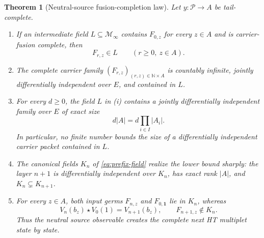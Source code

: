 \documentclass[11pt]{article}
\newtheorem{theorem}{Theorem}[section]
\theoremstyle{definition}
\theoremstyle{remark}
\newcommand{\N}{\mathbb N}
\newcommand{\cM}{\mathcal M}
\newcommand{\cP}{\mathcal P}
\begin{document}
\begin{theorem}[Neutral-source fusion-completion law]\label{thm:master}
Let \(y:\cP\to A\) be tail-complete.

\begin{enumerate}[label=\textup{(\roman*)},leftmargin=2.5em]
  \item If an intermediate field \(L\subseteq\cM_\infty\) contains
  \(F_{0,z}\) for every \(z\in A\) and is carrier-fusion complete, then
  \[
   F_{r,z}\in L\qquad(r\geq0,\ z\in A).
  \]

  \item The complete carrier family \((F_{r,z})_{(r,z)\in\N\times A}\) is countably infinite,
  jointly differentially independent over \(E\), and contained in \(L\).

  \item For every \(d\geq0\), the field \(L\) in \textup{(i)} contains a jointly
  differentially independent family over \(E\) of exact size
  \begin{equation}\label{eq:forced-rank}
   d|A|=d\prod_{i\in I}|A_i|.
  \end{equation}
  In particular, no finite number bounds the size of a differentially independent carrier packet
  contained in \(L\).

  \item The canonical fields \(K_n\) of \eqref{eq:prefix-field} realize the lower bound sharply:
  the layer \(n+1\) is differentially independent over \(K_n\), has exact rank \(|A|\), and
  \(K_n\subsetneq K_{n+1}\).

  \item For every \(z\in A\), both input germs \(F_{n,z}\) and \(F_{0,\mathbf1}\) lie in
  \(K_n\), whereas
  \begin{equation}\label{eq:neutral-creation}
   V_n(b_z)\star V_0(1)=V_{n+1}(b_z),
   \qquad F_{n+1,z}\notin K_n.
  \end{equation}
  Thus the neutral source observable creates the complete next HT multiplet state by state.
\end{enumerate}
\end{theorem}
\end{document}
